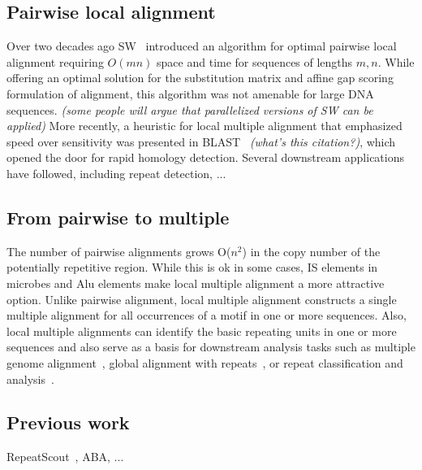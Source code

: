 \documentclass{llncs}
\begin{document}
\subsection{ Pairwise local alignment}
Over two decades ago SW~\cite{ref-sw} introduced an algorithm for optimal pairwise local alignment requiring $O(mn)$ space and time for sequences of lengths $m,n$. While offering an optimal solution for the substitution matrix and affine gap scoring formulation of alignment, this algorithm was not amenable for large DNA sequences. \textit{(some people will argue that parallelized versions of SW can be applied)} More recently, a heuristic for local multiple alignment that emphasized speed over sensitivity was presented in BLAST~\cite{...} \textit{(what's this citation?)}, which opened the door for rapid homology detection. Several downstream applications have followed, including repeat detection, ...

\subsection{ From pairwise to multiple}
The number of pairwise alignments grows O($n^{2}$) in the copy number of the potentially repetitive region. While this is ok in some cases, IS elements in microbes and Alu elements make local multiple alignment a more attractive option.
Unlike pairwise alignment, local multiple alignment constructs a
single multiple alignment for all occurrences of a motif in one or
more sequences.  Also, local multiple alignments
can identify the basic repeating units in one or more sequences and also
serve as a basis for downstream analysis tasks such as multiple genome
alignment~\cite{ref-mauve,ref-mga,ref-mgcat,ref-deweyReview}, global
alignment with repeats~\cite{ref-otherSammethPaper,ref-aba}, or
repeat classification and analysis~\cite{ref-piler}.

\subsection{Previous work}
RepeatScout~\cite{ref-repeatscout}, ABA, ...

\label{sec:overview}
\end{document}

